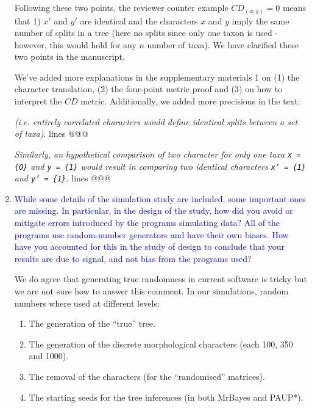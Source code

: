 \documentclass[12pt,letterpaper]{article}
\begin{document}
\begin{enumerate}
Following these two points, the reviewer counter example $CD_{(x,y)} = 0$ means that 1) $x'$ and $y'$ are identical and the characters $x$ and $y$ imply the same number of splits in a tree (here no splits since only one taxon is used - however, this would hold for any $n$ number of taxa).
We have clarified these two points in the manuscript.

We've added more explanations in the supplementary materials 1 on (1) the character translation, (2) the four-point metric proof and (3) on how to interpret the $CD$ metric.
Additionally, we added more precisions in the text:

\textit{(i.e. entirely correlated characters would define identical splits between a set of taxa)}. lines @@@

\textit{Similarly, an hypothetical comparison of two character for only one taxa \texttt{x = \{0\}} and \texttt{y = \{1\}} would result in comparing two identical characters \texttt{x' = \{1\}} and \texttt{y' = \{1\}}.} lines @@@






















\item{\textcolor{blue}{While some details of the simulation study are included, some important ones are missing. In particular, in the design of the study, how did you avoid or mitigate errors introduced by the programs simulating data? All of the programs use random-number generators and have their own biases. How have you accounted for this in the study of design to conclude that your results are due to signal, and not bias from the programs used?}}


We do agree that generating true randomness in current software is tricky but we are not sure how to answer this comment.
In our simulations, random numbers where used at different levels:

\begin{enumerate}
    \item The generation of the ``true'' tree.
    \item The generation of the discrete morphological characters (each 100, 350 and 1000).
    \item The removal of the characters (for the ``randomised'' matrices).
    \item The starting seeds for the tree inferences (in both MrBayes and PAUP*).
\end{enumerate}


\end{enumerate}
\end{document}
